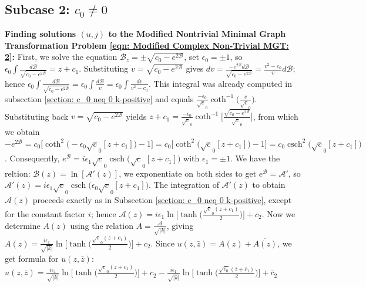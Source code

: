\documentclass[12pt]{article}
\theoremstyle{plain}
\theoremstyle{definition}
\theoremstyle{remark}
\begin{document}
  \subsection{Subcase 2: $c_0\neq0$}\label{section: c_0 neq 0 k-negative}
  
  \textbf{Finding solutions \((u,j)\) to the Modified Nontrivial Minimal Graph Transformation Problem \ref{eqn: Modified Complex Non-Trivial MGT: 2}:} First, we solve the equation \(\mathcal{B}_z=\pm \sqrt{c_0-e^{2\mathcal{B}}}\), set \(\epsilon_0=\pm1\), so \(\epsilon_0 \int\tfrac{d\mathcal{B}}{\sqrt{c_0-e^{2\mathcal{B}}}}=z+c_1\). Substituting \(v=\sqrt{c_0-e^{2\mathcal{B}}}\) gives \(dv=\tfrac{-e^{2\mathcal{B}}d\mathcal{B}}{\sqrt{c_0-e^{2\mathcal{B}}}}=\tfrac{v^2-c_0}{v}d\mathcal{B}\); hence \(\epsilon_0 \int\tfrac{d\mathcal{B}}{\sqrt{c_0-e^{2\mathcal{B}}}}=\epsilon_0\int \tfrac{d\mathcal{B}}{v}=\epsilon_0 \int \tfrac{dv}{v^2-c_0}\). This integral was already computed in subsection \ref{section: c_0 neq 0 k-positive} and equals \(\tfrac{-\epsilon_0}{\sqrt c_0}\coth^{-1}\!\big(\tfrac{v}{\sqrt c_0}\big)\). Substituting back \(v=\sqrt{c_0-e^{2\mathcal{B}}}\) yields \footnotesize\(z+c_1=\tfrac{-\epsilon_0}{\sqrt c_0}\coth^{-1}\!\big[\frac{\sqrt{c_0-e^{2\mathcal{B}}}}{\sqrt c_0}\big]\)\normalsize, from which we obtain \footnotesize\(-e^{2\mathcal{B}}=c_0\big[\coth^2\!\big(-\epsilon_0\sqrt c_0[z+c_1]\big)-1\big]=c_0\big[\coth^2\!\big(\sqrt c_0[z+c_1]\big)-1\big]=c_0\operatorname{csch}^2\!\big(\sqrt c_0[z+c_1]\big)\)\normalsize. Consequently, \(e^{\mathcal{B}}=i\epsilon_1\sqrt c_0\operatorname{csch}\!\big(\sqrt c_0[z+c_1]\big)\) with \(\epsilon_1=\pm1\). We have the reltion: \(\mathcal{B}(z)=\ln[\mathcal{A}'(z)]\), we exponentiate on both sides to get \(e^\mathcal{B}=\mathcal{A}'\), so \(\mathcal{A}'(z)=i\epsilon_1\sqrt c_0\operatorname{csch}\!\big(\epsilon_0\sqrt c_0[z+c_1]\big)\). The integration of \(\mathcal{A}'(z)\) to obtain \(\mathcal{A}(z)\) proceeds exactly as in Subsection \ref{section: c_0 neq 0 k-positive}, except for the constant factor \(i\); hence \(\mathcal{A}(z)=i\epsilon_1\ln\!\big[\tanh\!\big(\tfrac{\sqrt c_0(z+c_1)}{2}\big)\big]+c_2\). Now we determine \(A(z)\) using the relation \(A=\frac{\mathcal{A}}{\sqrt{|k|}}\), giving \(A(z)=\frac{i\epsilon_1}{\sqrt{|k|}}\ln\!\big[\tanh\!\big(\tfrac{\sqrt c_0(z+c_1)}{2}\big)\big]+c_2\). Since \(u(z,\bar z)=A(z)+\overline{A(z)}\), we get formula for \(u(z,\bar z):\) 
  \footnotesize\(
    u(z,\bar z)=\tfrac{i\epsilon_1}{\sqrt{|k|}}\ln\!\big[\tanh\!\big(\tfrac{\sqrt c_0(z+c_1)}{2}\big)\big]+c_2-\tfrac{i\epsilon_1}{\sqrt{|k|}}\ln\!\big[\tanh\!\big(\tfrac{\sqrt{\bar c_0}(\bar z+\bar c_1)}{2}\big)\big]+\bar c_2
  \)\normalsize
  
\end{document}
